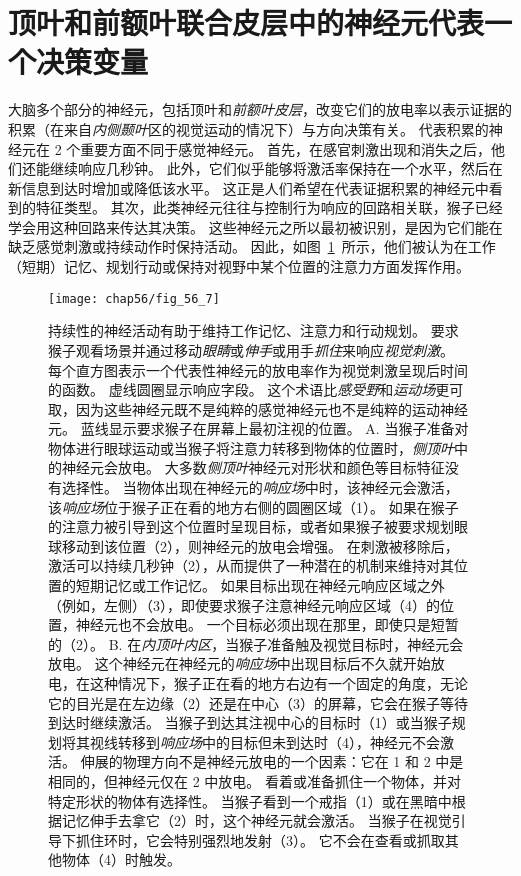 \section{顶叶和前额叶联合皮层中的神经元代表一个决策变量}

大脑多个部分的神经元，包括顶叶和\textit{前额叶皮层}，改变它们的放电率以表示证据的积累（在来自\textit{内侧颞叶}区的视觉运动的情况下）与方向决策有关。
代表积累的神经元在 2 个重要方面不同于感觉神经元。
首先，在感官刺激出现和消失之后，他们还能继续响应几秒钟。
此外，它们似乎能够将激活率保持在一个水平，然后在新信息到达时增加或降低该水平。
这正是人们希望在代表证据积累的神经元中看到的特征类型。
其次，此类神经元往往与控制行为响应的回路相关联，猴子已经学会用这种回路来传达其决策。
这些神经元之所以最初被识别，是因为它们能在缺乏感觉刺激或持续动作时保持活动。
因此，如图~\ref{fig:56_7}~所示，他们被认为在工作（短期）记忆、规划行动或保持对视野中某个位置的注意力方面发挥作用。


\begin{figure}[htbp]
	\centering
	\texttt{[image: chap56/fig\_56\_7]}
	\caption{持续性的神经活动有助于维持工作记忆、注意力和行动规划。
		要求猴子观看场景并通过移动\textit{眼睛}或\textit{伸手}或用手\textit{抓住}来响应\textit{视觉刺激}。
		每个直方图表示一个代表性神经元的放电率作为视觉刺激呈现后时间的函数。
		虚线圆圈显示响应字段。
		这个术语比\textit{感受野}和\textit{运动场}更可取，因为这些神经元既不是纯粹的感觉神经元也不是纯粹的运动神经元。
		蓝线显示要求猴子在屏幕上最初注视的位置。
		A. 当猴子准备对物体进行眼球运动或当猴子将注意力转移到物体的位置时，\textit{侧顶叶}中的神经元会放电。
		大多数\textit{侧顶叶}神经元对形状和颜色等目标特征没有选择性。
		当物体出现在神经元的\textit{响应场}中时，该神经元会激活，该\textit{响应场}位于猴子正在看的地方右侧的圆圈区域（1）。
		如果在猴子的注意力被引导到这个位置时呈现目标，或者如果猴子被要求规划眼球移动到该位置（2），则神经元的放电会增强。
		在刺激被移除后，激活可以持续几秒钟（2），从而提供了一种潜在的机制来维持对其位置的短期记忆或工作记忆。
		如果目标出现在神经元响应区域之外（例如，左侧）（3），即使要求猴子注意神经元响应区域（4）的位置，神经元也不会放电。
		一个目标必须出现在那里，即使只是短暂的（2）。
		B. 在\textit{内顶叶内区}，当猴子准备触及视觉目标时，神经元会放电。
		这个神经元在神经元的\textit{响应场}中出现目标后不久就开始放电，在这种情况下，猴子正在看的地方右边有一个固定的角度，无论它的目光是在左边缘（2）还是在中心（3）的屏幕，它会在猴子等待到达时继续激活。
		当猴子到达其注视中心的目标时（1）或当猴子规划将其视线转移到\textit{响应场}中的目标但未到达时（4），神经元不会激活。
		伸展的物理方向不是神经元放电的一个因素：它在 1 和 2 中是相同的，但神经元仅在 2 中放电。
		看着或准备抓住一个物体，并对特定形状的物体有选择性。
		当猴子看到一个戒指（1）或在黑暗中根据记忆伸手去拿它（2）时，这个神经元就会激活。
		当猴子在视觉引导下抓住环时，它会特别强烈地发射（3）。
		它不会在查看或抓取其他物体（4）时触发。}
	\label{fig:56_7}
\end{figure}


